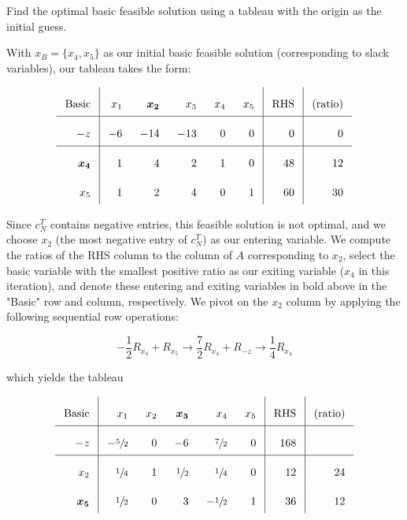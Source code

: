 Find the optimal basic feasible solution using a tableau with the origin as the initial guess.

\begin{solution}
  With $x_B = \{ x_4, x_5 \}$ as our initial basic feasible solution (corresponding to slack variables), our tableau
  takes the form:

  \[\arraycolsep=8pt\def\arraystretch{2.2}
  \begin{array}{r|rrrrr|r|r}
     \text{Basic} &  x_1  &  \bm{x_2}  &  x_3  &  x_4  & x_5 &  \text{RHS} & \text{(ratio)}  \\ \hline
    -z            &  -6   &  -14       &  -13  &   0   &  0  &   0         & 0               \\ \hline
     \bm{x_4}     &   1   &   4        &   2   &   1   &  0  &  48         & 12              \\
     x_5          &   1   &   2        &   4   &   0   &  1  &  60         & 30
  \end{array}
  \]

  Since $c_N^T$ contains negative entries, this feasible solution is not optimal, and we choose $x_2$ (the most negative
  entry of $c_N^T$) as our entering variable. We compute the ratios of the RHS column to the column of $A$ corresponding
  to $x_2$, select the basic variable with the smallest positive ratio as our exiting variable ($x_4$ in this 
  iteration), and denote these entering and exiting variables in bold above in the "Basic" row and column, 
  respectively. We pivot on the $x_2$ column by applying the following sequential row operations:

  $$
  -\frac{1}{2} R_{x_4} + R_{x_5}  \longrightarrow \frac{7}{2} R_{x_4} + R_{-z} \longrightarrow \frac{1}{4} R_{x_4}
  $$

  which yields the tableau
  
  \[\arraycolsep=8pt\def\arraystretch{2.2}
  \begin{array}{r|rrrrr|r|r}
     \text{Basic} &  x_1           &  x_2 &  \bm{x_3}      &   x_4           &   x_5 & \text{RHS}  & \text{(ratio)}  \\ \hline
     -z           & -\sfrac{5}{2}  &  0   &  -6            &   \sfrac{7}{2}  &   0   &  168        &                 \\ \hline
      x_2         &  \sfrac{1}{4}  &  1   &   \sfrac{1}{2} &   \sfrac{1}{4}  &   0   &  12         & 24              \\
     \bm{x_5}     &  \sfrac{1}{2}  &  0   &   3            &  -\sfrac{1}{2}  &   1   &  36         & 12              
  \end{array}
  \]


\end{solution}

